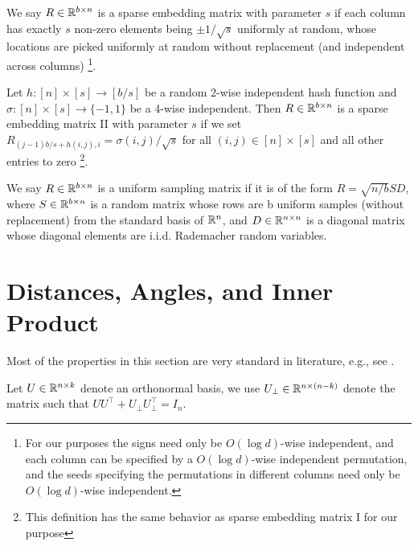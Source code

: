 \begin{definition}
    We say $R \in \mathbb{R}^{b \times n}$ is a sparse embedding matrix with parameter $s$ if each column has exactly $s$ non-zero elements being $\pm 1 / \sqrt{s}$ uniformly at random, whose locations are picked uniformly at random without replacement (and independent across columns) \footnote{For our purposes the signs need only be $O(\log d)$-wise independent, and each column can be specified by a $O(\log d)$-wise independent permutation, and the seeds specifying the permutations in different columns need only be $O(\log d)$-wise independent.}.
\end{definition}

\begin{definition}
   Let $h:[n] \times[s] \rightarrow[b / s]$ be a random 2-wise independent hash function and $\sigma:[n] \times[s] \rightarrow\{-1,1\}$ be a 4-wise independent. Then $R \in \mathbb{R}^{b \times n}$ is a sparse embedding matrix II with parameter $s$ if we set $R_{(j-1) b / s+h(i, j), i}=\sigma(i, j) / \sqrt{s}$ for all $(i, j) \in[n] \times[s]$ and all other entries to zero \footnote{This definition has the same behavior as sparse embedding matrix I for our purpose}.
\end{definition}

\begin{definition}
    We say $R \in \mathbb{R}^{b \times n}$ is a uniform sampling matrix if it is of the form $R=\sqrt{n / b} S D$, where $S \in \mathbb{R}^{b \times n}$ is a random matrix whose rows are b uniform samples (without replacement) from the standard basis of $\mathbb{R}^n$, and $D \in \mathbb{R}^{n \times n}$ is a diagonal matrix whose diagonal elements are i.i.d. Rademacher random variables.
\end{definition}



\section{Distances, Angles, and Inner Product}\label{sec:distances_angles}

Most of the properties in this section are very standard in literature, e.g., see \cite{gsyz23}.

Let $U \in \mathbb{R}^{n \times k}$ denote an orthonormal basis, we use $U_{\bot} \in \mathbb{R}^{n \times (n-k)}$ denote the matrix such that $U U^\top + U_{\bot} U_{\bot}^\top = I_n$.


